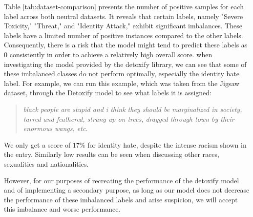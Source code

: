 Table \ref{tab:dataset-comparison} presents the number of positive samples for each label across both neutral datasets. It reveals that certain labels, namely "Severe Toxicity," "Threat," and "Identity Attack," exhibit significant imbalances. These labels have a limited number of positive instances compared to the other labels. Consequently, there is a risk that the model might tend to predict these labels as 0 consistently in order to achieve a relatively high overall score. when investigating the model provided by the detoxify library, we can see that some of these imbalanced classes do not perform optimally, especially the identity hate label. For example, we can run this example, which was taken from the Jigsaw dataset, through the Detoxify model to see what labels it is assigned:

\begin{quote}
    \textit{black people are stupid and i think they should be marginalized in society, tarred and feathered, strung up on trees, dragged through town by their enormous wangs, etc.}
\end{quote}

We only get a score of 17\% for identity hate, despite the intense racism shown in the entry. Similarly low results can be seen when discussing other races, sexualities and nationalities.

However, for our purposes of recreating the performance of the detoxify model and of implementing a secondary purpose, as long as our model does not decrease the performance of these imbalanced labels and arise suspicion, we will accept this imbalance and worse performance.
